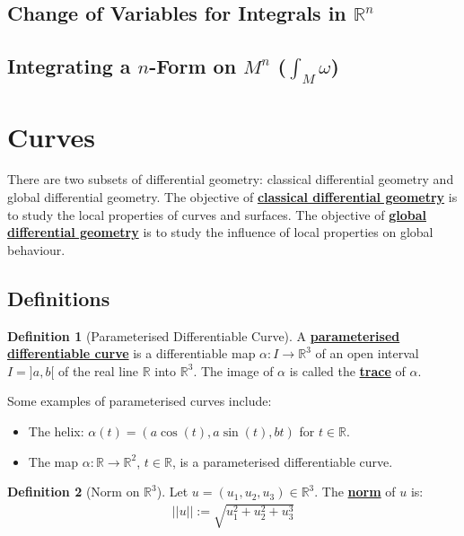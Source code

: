\documentclass[11pt]{scrartcl}
\newcommand{\R}[0]{\mathbb{R}}
\theoremstyle{definition}
\newtheorem{definition}{Definition}
\theoremstyle{remark}
\newcommand{\dfn}[1]{\textbf{\underline{#1}}}
\newcommand{\idx}[2]{\int_{#1}^{#2}}
\begin{document}
{\subsection{Change of Variables for Integrals in $\R^n$}

\subsection{Integrating a $n$-Form on $M^n$ ($\idx{M}{} \omega$)} 

\section{Curves}
There are two subsets of differential geometry: classical differential geometry and global differential geometry. The objective of \dfn{classical differential geometry} is to study the local properties of curves and surfaces. The objective of \dfn{global differential geometry} is to study the influence of local properties on global behaviour. 
\subsection{Definitions}

\begin{definition}[Parameterised Differentiable Curve] 
	A \dfn{parameterised differentiable curve} is a differentiable map $ \alpha: I \rightarrow \R^3$ of an open interval $I = ]a,b[$ of the real line $\R$ into $\R^3$. The image of $\alpha$ is called the \dfn{trace} of $\alpha$. 
\end{definition}

Some examples of parameterised curves include: 
\begin{itemize}[noitemsep]
	\item The helix: $\alpha(t) = (a \cos (t), a \sin(t), bt)$ for $t \in \R$. 
	\item The map $\alpha: \R \rightarrow \R^2$, $t \in \R$, is a parameterised differentiable curve. 
\end{itemize}

\begin{definition}[Norm on $\R^3$]
	Let $u = (u_1, u_2, u_3) \in \R^3$. The \dfn{norm} of $u$ is: 
	\begin{align*}
		|| u || := \sqrt{ u_1^2 + u_2^2 + u_3^3} 
	\end{align*}
\end{definition}

}
\end{document}

